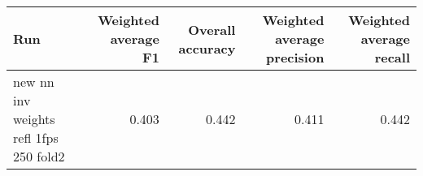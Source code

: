\begin{tabular}{lrrrr}
\toprule
Run & Weighted average F1 & Overall accuracy & Weighted average precision & Weighted average recall \\
\midrule
new nn inv weights refl 1fps 250 fold2 & 0.403 & 0.442 & 0.411 & 0.442 \\
\bottomrule
\end{tabular}
